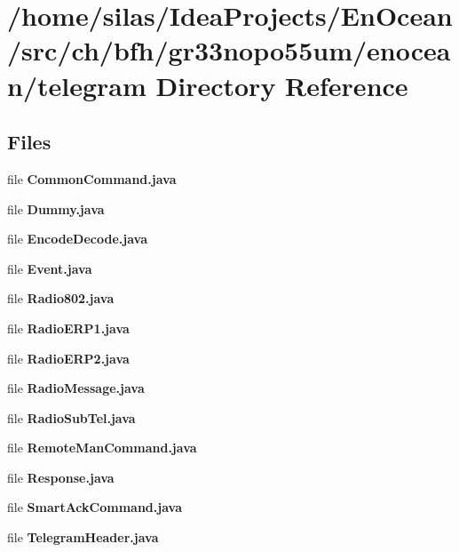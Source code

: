 \section{/home/silas/\+Idea\+Projects/\+En\+Ocean/src/ch/bfh/gr33nopo55um/enocean/telegram Directory Reference}
\label{dir_7afde4cd46e496766fffaad9a28da5df}
\subsection*{Files}
\begin{DoxyCompactItemize}
\item 
file {\bf Common\+Command.\+java}
\item 
file {\bf Dummy.\+java}
\item 
file {\bf Encode\+Decode.\+java}
\item 
file {\bf Event.\+java}
\item 
file {\bf Radio802.\+java}
\item 
file {\bf Radio\+E\+R\+P1.\+java}
\item 
file {\bf Radio\+E\+R\+P2.\+java}
\item 
file {\bf Radio\+Message.\+java}
\item 
file {\bf Radio\+Sub\+Tel.\+java}
\item 
file {\bf Remote\+Man\+Command.\+java}
\item 
file {\bf Response.\+java}
\item 
file {\bf Smart\+Ack\+Command.\+java}
\item 
file {\bf Telegram\+Header.\+java}
\end{DoxyCompactItemize}
